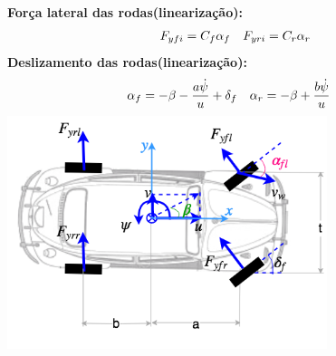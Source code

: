 \documentclass{beamer}
\begin{document}
 \begin{frame}[t]%

 \noindent\textbf{Força lateral das rodas(linearização):}
    \begin{equation*}
    \begin{split}
	F_{yfi} = C_f\alpha_f \enskip&\enskip F_{yri} = C_r\alpha_r\\
    \end{split}
    \end{equation*}
\vspace{-0.2 cm}
\noindent\textbf{Deslizamento das rodas(linearização):} 
    \begin{equation*}
    \begin{split}
		\alpha_f  = -\beta - \frac{a\dot{\psi}}{u} + \delta_f \enskip&\enskip
		\alpha_r  = -\beta + \frac{b\dot{\psi}}{u}
    \end{split}
    \end{equation*}
	\includegraphics[width=0.7\textwidth]{carmodel.png}%
\end{frame}%
\end{document}
